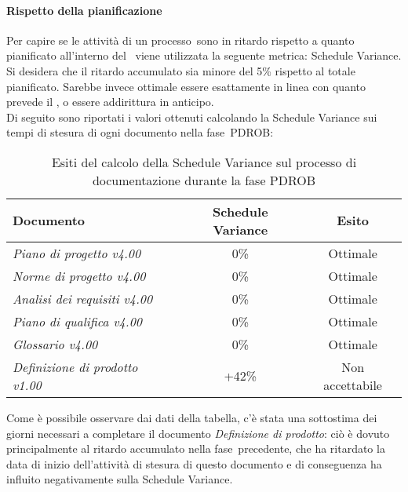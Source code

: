 \documentclass[../PianoDiQualifica.tex]{subfiles}
\begin{document}
\begin{appendices}
			\paragraph{Rispetto della pianificazione}
			Per capire se le attività di un processo\g\ sono in ritardo rispetto a quanto pianificato all'interno del \pianodiprogetto\ viene utilizzata la seguente metrica: Schedule Variance.\\
			Si desidera che il ritardo accumulato sia minore del 5\% rispetto al totale pianificato. Sarebbe invece ottimale essere esattamente in linea con quanto prevede il \pianodiprogetto, o essere addirittura in anticipo.\\
			Di seguito sono riportati i valori ottenuti calcolando la Schedule Variance sui tempi di stesura di ogni documento nella fase\g\ PDROB:
			\begin{table}[H]
				\centering
				\begin{tabular}{l * {2}{c}}
					\toprule
					\textbf{Documento} & \textbf{Schedule Variance} & \textbf{Esito} \\
					\midrule
					\textit{Piano di progetto v4.00} & 0\% &  Ottimale \\
					\textit{Norme di progetto v4.00} & 0\% & Ottimale \\
					\textit{Analisi dei requisiti v4.00} & 0\% & Ottimale \\
					\textit{Piano di qualifica v4.00} & 0\% & Ottimale \\
					\textit{Glossario v4.00} & 0\% & Ottimale \\
					\textit{Definizione di prodotto v1.00} & +42\% & Non accettabile \\
					\bottomrule
				\end{tabular}
				\caption{Esiti del calcolo della Schedule Variance sul processo di documentazione durante la fase PDROB}
				\label{tab:esiti_schedule_variance}
			\end{table}
			Come è possibile osservare dai dati della tabella, c'è stata una sottostima dei giorni necessari a completare il documento \textit{Definizione di prodotto}: ciò è dovuto principalmente al ritardo accumulato nella fase\g\ precedente, che ha ritardato la data di inizio dell'attività di stesura di questo documento e di conseguenza ha influito negativamente sulla Schedule Variance.
			

\end{appendices}
\end{document}
